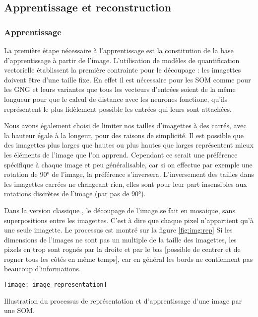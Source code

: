 	\subsection{Apprentissage et reconstruction}\label{sec:img:compression}
	\subsubsection{Apprentissage}
	La première étape nécessaire à l'apprentissage est la constitution de la base d'apprentissage à partir de l'image. L'utilisation de modèles de quantification vectorielle établissent la première contrainte pour le découpage : les imagettes doivent être d'une taille fixe. En effet il est nécessaire pour les SOM comme pour les GNG et leurs variantes que tous les vecteurs d'entrées soient de la même longueur pour que le calcul de distance avec les neurones fonctione, qu'ils représentent le plus fidèlement possible les entrées qui leurs sont attachées.

	Nous avons également choisi de limiter nos tailles d'imagettes à des carrés, avec la hauteur égale à la longeur, pour des raisons de simplicité. Il est possible que des imagettes plus larges que hautes ou plus hautes que larges représentent mieux les éléments de l'image que l'on apprend. Cependant ce serait une préférence spécifique à chaque image et peu généralisable, car si on effectue par exemple une rotation de 90° de l'image, la préférence s'inversera. L'inversement des tailles dans les imagettes carrées ne changeant rien, elles sont pour leur part insensibles aux rotations discrètes de l'image (par pas de 90°).

	Dans la version classique \cite{amerijckx-compression}, le découpage de l'image se fait en mosaique, sans superpositions entre les imagettes. C'est à dire que chaque pixel n'appartient qu'à une seule imagette. Le processus est montré sur la figure \ref{fig:img:rep} Si les dimensions de l'images ne sont pas un multiple de la taille des imagettes, les pixels en trop sont rognés par la droite et par le bas [possible de centrer et de rogner tous les côtés en même temps], car en général les bords ne contiennent pas beaucoup d'informations.

	\begin{figureth}
		\texttt{[image: image\_representation]}
		\caption[Représentation d'une image]{Illustration du processus de représentation et d'apprentissage d'une image par une SOM.}\label{fig:img:rep}
	\end{figureth}

